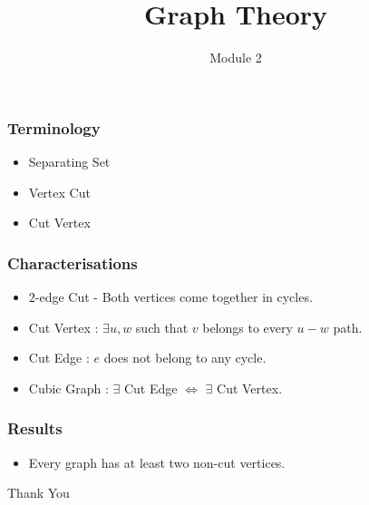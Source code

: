 \documentclass{beamer}
\title{Graph Theory}
\author{Module 2}
\institute{Section 2 : Vertex/Edge Cut}
\begin{document}
\begin{frame}
	\maketitle
\end{frame}

\begin{frame}
	\tableofcontents
\end{frame}

\begin{frame}
	\frametitle{Terminology}
	\begin{itemize}
		\item Separating Set
		\item Vertex Cut
		\item Cut Vertex
	\end{itemize}
\end{frame}

\begin{frame}
\frametitle{Characterisations}
\begin{itemize}
	\item $2$-edge Cut - Both vertices come together in cycles.
	\item Cut Vertex : $\exists u,w$ such that $v$ belongs to every $u-w$ path.
	\item Cut Edge : $e$ does not belong to any cycle.
	\item Cubic Graph : $\exists$ Cut Edge $\iff$  $\exists$ Cut Vertex.
\end{itemize}
\end{frame}

\begin{frame}
\frametitle{Results}
\begin{itemize}
	\item Every graph has at least two non-cut vertices.
\end{itemize}
\end{frame}

\begin{frame}
	\vspace{0.6in}
	\hspace{3cm} {\color{blue}\Huge{Thank You}}
\end{frame}
\end{document}
